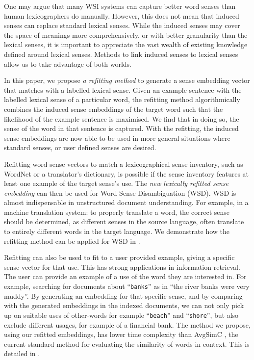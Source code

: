 \documentclass{llncs}
\def\parencite{\cite}
\newcommand{\wordquote}[1]{\enquote{\texttt{#1}}}
\begin{document}
One may argue that many WSI systems can capture better word senses than human lexicographers do manually.
However, this does not mean that induced senses can replace standard lexical senses.
While the induced senses may cover the space of meanings more comprehensively, or with better granularity than the lexical senses, it is important to appreciate the vast wealth of existing knowledge defined around lexical senses.
Methods to link induced senses to lexical senses allow us to take advantage of both worlds.


In this paper, we propose \emph{a refitting method} to generate a sense embedding vector that matches with a labelled lexical sense.
Given an example sentence with the labelled lexical sense of a particular word, the refitting method algorithmically combines the induced sense embeddings of the target word such that the likelihood of the example sentence is maximised.
We find that in doing so, the sense of the word in that sentence is captured.
With the refitting, the induced sense embeddings are now able to be used in more general situations where standard senses, or user defined senses are desired.


Refitting word sense vectors to match a lexicographical sense inventory, such as WordNet or a translator's dictionary, is possible if the sense inventory features at least one example of the target sense's use.
The \emph{new lexically refitted sense embedding} can then be used for Word Sense Disambiguation (WSD).
WSD is almost indispensable in unstructured document understanding.
For example, in a machine translation system: to properly translate a word, the correct sense should be determined, as different senses in the source language, often translate to entirely different words in the target language.
We demonstrate how the refitting method can be applied for WSD in .

Refitting can also be used to fit to a user provided example, giving a specific sense vector for that use.
This has strong applications in information retrieval.
The user can provide an example of a use of the word they are interested in.
For example, searching for documents about 
\wordquote{banks} as in \enquote{the river banks were very muddy}.
By generating an embedding for that specific sense, and by comparing with the generated embeddings in the indexed documents, we can not only pick up on suitable uses of other-words for example \wordquote{beach} and \wordquote{shore},
but also exclude different usages, for example of a financial bank.
The method we propose, using our refitted embeddings, has lower time complexity than AvgSimC \parencite{Reisinger2010}, the current standard method for evaluating the similarity of words in context.
This is detailed in .
\end{document}
